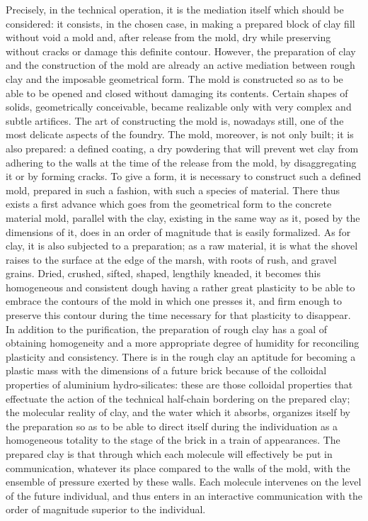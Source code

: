 \documentclass[a4paper]{article}
\begin{document}
Precisely, in the technical operation, it is the mediation itself which should be considered: it consists, in the chosen case, in making a prepared block of clay fill without void a mold and, after release from the mold, dry while preserving without cracks or damage this definite contour. However, the preparation of clay and the construction of the mold are already an active mediation between rough clay and the imposable geometrical form. The mold is constructed so as to be able to be opened and closed without damaging its contents. Certain shapes of solids, geometrically conceivable, became realizable only with very complex and subtle artifices. The art of constructing the mold is, nowadays still, one of the most delicate aspects of the foundry. The mold, moreover, is not only built; it is also prepared: a defined coating, a dry powdering that will prevent wet clay from adhering to the walls at the time of the release from the mold, by disaggregating it or by forming cracks. To give a form, it is necessary to construct such a defined mold, prepared in such a fashion, with such a species of material. There thus exists a first advance which goes from the geometrical form to the concrete material mold, parallel with the clay, existing in the same way as it, posed by the dimensions of it, does in an order of magnitude that is easily formalized. As for clay, it is also subjected to a preparation; as a raw material, it is what the shovel raises to the surface at the edge of the marsh, with roots of rush, and gravel grains. Dried, crushed, sifted, shaped, lengthily kneaded, it becomes this homogeneous and consistent dough having a rather great plasticity to be able to embrace the contours of the mold in which one presses it, and firm enough to preserve this contour during the time necessary for that plasticity to disappear. In addition to the purification, the preparation of rough clay has a goal of obtaining homogeneity and a more appropriate degree of humidity for reconciling plasticity and consistency. There is in the rough clay an aptitude for becoming a plastic mass with the dimensions of a future brick because of the colloidal properties of aluminium hydro-silicates: these are those colloidal properties that effectuate the action of the technical half-chain bordering on the prepared clay; the molecular reality of clay, and the water which it absorbs, organizes itself by the preparation so as to be able to direct itself during the individuation as a homogeneous totality to the stage of the brick in a train of appearances. The prepared clay is that through which each molecule will effectively be put in communication, whatever its place compared to the walls of the mold, with the ensemble of pressure exerted by these walls. Each molecule intervenes on the level of the future individual, and thus enters in an interactive communication with the order of magnitude superior to the individual.
\end{document}

